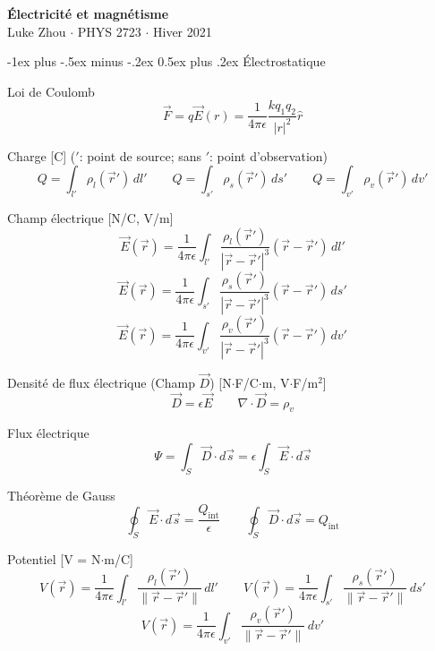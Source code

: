 \documentclass[10pt,landscape]{article}
\makeatletter
\renewcommand{\section}{\@startsection{section}{1}{0mm}%
                                {-1ex plus -.5ex minus -.2ex}%
                                {0.5ex plus .2ex}%
                                {\normalfont\large\bfseries}}
\makeatother
\begin{document}
\raggedright
\footnotesize
\begin{multicols}{3}


\setlength{\premulticols}{1pt}
\setlength{\postmulticols}{1pt}
\setlength{\multicolsep}{1pt}
\setlength{\columnsep}{2pt}

\begin{center}
     \Large{\textbf{Électricité et magnétisme}} \\
     \small{Luke Zhou $\cdot$ PHYS 2723 $\cdot$ Hiver 2021}
\end{center}

\section{Électrostatique}

Loi de Coulomb  
 \[ \vec{F} = q\vec{E}(r) = \frac{1}{4\pi\epsilon} \frac{kq_1q_2}{|r|^2} \hat{r}  \]

Charge  [C] ($'$: point de source; sans $'$: point d'observation)
\[  Q = \int_{l'} \rho_l(\vec{r}') \,dl'  \qquad  Q = \int_{s'} \rho_s(\vec{r}') \,ds'  \qquad Q = \int_{v'} \rho_v(\vec{r}') \,dv'  \]

Champ électrique [N/C, V/m]
\[ \vec{E}(\vec{r}) = \frac{1}{4\pi\epsilon} \int_{l'} \frac{\rho_l(\vec{r}')}{| \vec{r} - \vec{r}' |^3 } (\vec{r} - \vec{r}' )\,dl'  \]
%
\[\vec{E}(\vec{r}) = \frac{1}{4\pi\epsilon} \int_{s'} \frac{\rho_s(\vec{r}')}{| \vec{r} - \vec{r}'|^3 } (\vec{r} - \vec{r}' )\,ds' \]
%
\[\vec{E}(\vec{r}) = \frac{1}{4\pi\epsilon} \int_{v'} \frac{\rho_v(\vec{r}')}{| \vec{r} - \vec{r}' |^3 } (\vec{r} - \vec{r}' )\,dv'  \]

Densité de flux électrique (Champ $\vec{D}$)  [N$\cdot$F/C$\cdot$m, V$\cdot$F/m${}^2$]
\[ \vec{D} = \epsilon\vec{E}
\qquad \nabla \cdot \vec{D} = \rho_v \]

Flux électrique
\[ \Psi = \int_{S} \vec{D} \cdot d\vec{s} = \epsilon \int_{S} \vec{E} \cdot d\vec{s} \]

Théorème de Gauss
\[ \oint_S \vec{E}\cdot d\vec{s} = \frac{Q_\text{int}}{\epsilon}
\qquad  \oint_S \vec{D}\cdot d\vec{s} = Q_\text{int} \]

Potentiel [V = N$\cdot$m/C]
\[ {V}(\vec{r}) = \frac{1}{4\pi\epsilon} \int_{l'} \frac{\rho_l(\vec{r}')}{\| \vec{r} - \vec{r}' \| } \,dl'
\qquad  {V}(\vec{r}) = \frac{1}{4\pi\epsilon} \int_{s'} \frac{\rho_s(\vec{r}')}{\| \vec{r} - \vec{r}' \| } \,ds'  \]
%
\[ {V}(\vec{r}) = \frac{1}{4\pi\epsilon} \int_{v'} \frac{\rho_v(\vec{r}')}{\| \vec{r} - \vec{r}' \| } \,dv'  \]


\end{multicols}
\end{document}
